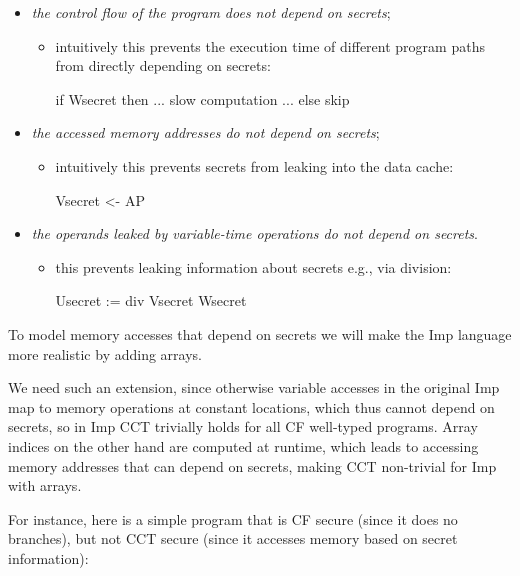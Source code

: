 \documentclass[12pt]{report}
\begin{document}
\begin{itemize}
\item  \textit{the control flow of the program does not depend on secrets};

\begin{itemize}
\item  intuitively this prevents the execution time of different program paths
        from directly depending on secrets:


        if Wsecret then ... slow computation ... else skip



\end{itemize}

\item  \textit{the accessed memory addresses do not depend on secrets};

\begin{itemize}
\item  intuitively this prevents secrets from leaking into the data cache:


        Vsecret <- AP



\end{itemize}

\item  \textit{the operands leaked by variable-time operations do not depend on secrets}.

\begin{itemize}
\item  this prevents leaking information about secrets e.g., via division:


        Usecret := div Vsecret Wsecret

\end{itemize}

\end{itemize}


 To model memory accesses that depend on secrets we will make the Imp
    language more realistic by adding arrays. 

 We need such an extension, since
    otherwise variable accesses in the original Imp map to memory operations at
    constant locations, which thus cannot depend on secrets, so in Imp CCT
    trivially holds for all CF well-typed programs. Array indices on the other
    hand are computed at runtime, which leads to accessing memory addresses that
    can depend on secrets, making CCT non-trivial for Imp with arrays.


    For instance, here is a simple program that is CF secure (since it does no
    branches), but not CCT secure (since it accesses memory based on secret
    information):
\end{document}
